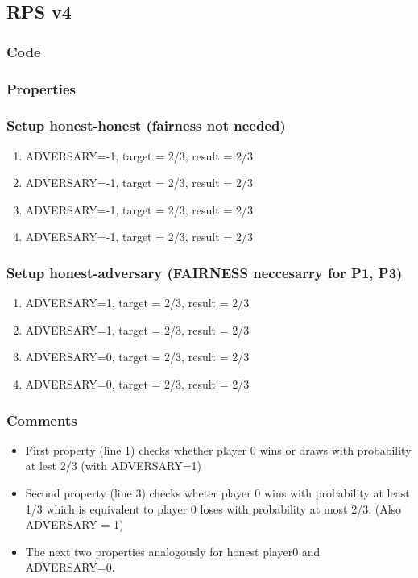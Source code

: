 \documentclass{article}
\begin{document}
\subsection{RPS v4}
\subsubsection{Code}



\subsubsection{Properties}



\subsubsection{Setup honest-honest (fairness not needed)}

\begin{enumerate}
\item ADVERSARY=-1, target = 2/3, result = 2/3
\item ADVERSARY=-1, target = 2/3, result = 2/3
\item ADVERSARY=-1, target = 2/3, result = 2/3
\item ADVERSARY=-1, target = 2/3, result = 2/3
\end{enumerate}

\subsubsection{Setup honest-adversary (FAIRNESS neccesarry for P1, P3)}

\begin{enumerate}
\item ADVERSARY=1, target = 2/3, result = 2/3
\item ADVERSARY=1, target = 2/3, result = 2/3
\item ADVERSARY=0, target = 2/3, result = 2/3
\item ADVERSARY=0, target = 2/3, result = 2/3
\end{enumerate}

\subsubsection{Comments}

\begin{itemize}
\item First property (line 1) checks whether player 0 wins or draws with probability at lest 2/3 (with ADVERSARY=1)
\item Second property (line 3) checks wheter player 0 wins with probability at least 1/3 which is equivalent to player 0
loses with probability at most 2/3. (Also ADVERSARY = 1)
\item The next two properties analogously for honest player0 and ADVERSARY=0.
\end{itemize}
\end{document}
